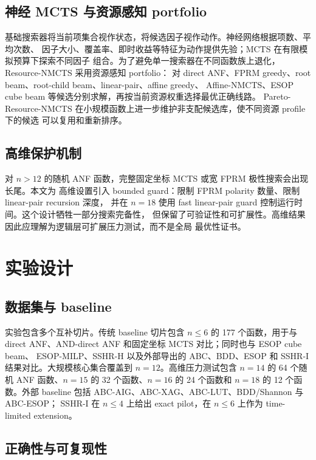 \documentclass[UTF8,fontset=macnew,11pt]{ctexart}
\newcommand{\method}{Resource-NMCTS}
\newcommand{\paretomethod}{Pareto-Resource-NMCTS}
\begin{document}
\subsection{神经 MCTS 与资源感知 portfolio}

基础搜索器将当前项集合视作状态，将候选因子视作动作。神经网络根据项数、平均次数、
因子大小、覆盖率、即时收益等特征为动作提供先验；MCTS 在有限模拟预算下探索不同因子
组合。为了避免单一搜索器在不同函数族上退化，\method{} 采用资源感知 portfolio：
对 direct ANF、FPRM greedy、root beam、root-child beam、linear-pair、affine greedy、
Affine-NMCTS、ESOP cube beam 等候选分别求解，再按当前资源权重选择最优正确线路。
\paretomethod{} 在小规模函数上进一步维护非支配候选库，使不同资源 profile 下的候选
可以复用和重新排序。

\subsection{高维保护机制}

对 $n>12$ 的随机 ANF 函数，完整固定坐标 MCTS 或宽 FPRM 极性搜索会出现长尾。本文为
高维设置引入 bounded guard：限制 FPRM polarity 数量、限制 linear-pair recursion 深度，
并在 $n=18$ 使用 fast linear-pair guard 控制运行时间。这个设计牺牲一部分搜索完备性，
但保留了可验证性和可扩展性。高维结果因此应理解为逻辑层可扩展压力测试，而不是全局
最优性证书。

\section{实验设计}

\subsection{数据集与 baseline}

实验包含多个互补切片。传统 baseline 切片包含 $n\leq 6$ 的 177 个函数，用于与
direct ANF、AND-direct ANF 和固定坐标 MCTS 对比；同时也与 ESOP cube beam、
ESOP-MILP、SSHR-H 以及外部导出的 ABC、BDD、ESOP 和 SSHR-I 结果对比。大规模核心集合覆盖到 $n=12$。高维压力测试包含
$n=14$ 的 64 个随机 ANF 函数、$n=15$ 的 32 个函数、$n=16$ 的 24 个函数和 $n=18$ 的
12 个函数。外部 baseline 包括 ABC-AIG、ABC-XAG、ABC-LUT、BDD/Shannon 与 ABC-ESOP；
SSHR-I 在 $n\leq 4$ 上给出 exact pilot，在 $n\leq 6$ 上作为 time-limited extension。

\subsection{正确性与可复现性}
\end{document}
